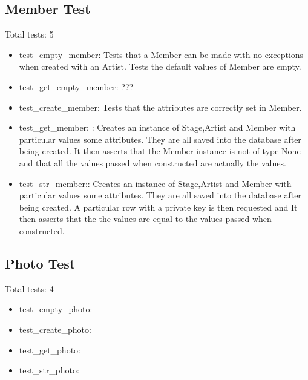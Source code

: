 \documentclass[12pt,english]{scrartcl}
\begin{document}
\subsection{Member Test} 
Total tests: 5

\begin{itemize} 
\item test\_empty\_member:  Tests that a Member can be made with no exceptions when created with an Artist. Tests the default values of Member are empty.
 
\item  test\_get\_empty\_member: ???
 
\item  test\_create\_member: Tests that the attributes are correctly set in Member.
 
\item  test\_get\_member: : Creates an instance of Stage,Artist and Member with particular values some 
attributes. They are all saved into the database after being created. It then asserts that the 
Member instance is not of type None and that all the values passed when constructed are 
actually the values.  
 
\item  test\_str\_member:: Creates an instance of Stage,Artist and Member with particular values some 
attributes. They are all saved into the database after being created.  A particular row with a 
private key is then requested and It then asserts that the the values are equal to the values 
passed when constructed.  
\end{itemize}

\subsection{Photo Test} 
Total tests: 4
\begin{itemize}
\item test\_empty\_photo: 
\item test\_create\_photo: 
\item test\_get\_photo: 
\item test\_str\_photo: 
\end{itemize}
\end{document}

